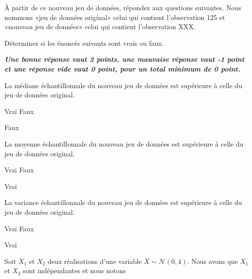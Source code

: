 \begin{questions}
\begin{parts}
À partir de ce nouveau jeu de données, répondez aux questions suivantes. Nous nommons «jeu de données original» celui qui contient l'observation 125 et «nouveau jeu de données» celui qui contient l'observation XXX.

Déterminez si les énoncés suivants sont vrais ou faux. 

\textbf{\textit{Une bonne réponse vaut 2 points, une mauvaise réponse vaut -1 point et une réponse vide vaut 0 point, pour un total minimum de 0 point.}}

\begin{subparts}
\subpart La médiane échantillonnale du nouveau jeu de données est supérieure à celle du jeu de données original.

    \begin{oneparcheckboxes}
        \choice Vrai
        \correctchoice Faux
    \end{oneparcheckboxes}
    
\begin{solution}
    Faux
\end{solution}

\subpart La moyenne échantillonnale du nouveau jeu de données est supérieure à celle du jeu de données original.

    \begin{oneparcheckboxes}
        \correctchoice Vrai
        \choice Faux
    \end{oneparcheckboxes}
    
\begin{solution}
    Vrai
\end{solution}

\subpart La variance échantillonnale du nouveau jeu de données est supérieure à celle du jeu de données original.

    \begin{oneparcheckboxes}
        \correctchoice Vrai
        \choice Faux
    \end{oneparcheckboxes}
    
\begin{solution}
    Vrai
\end{solution}

\end{subparts}
\end{parts}

\newpage

\question\label{estimateursPonctuels} 
Soit $X_1$ et $X_2$ deux réalisations d'une variable $X\sim\mathcal{N}(0, 4)$. Nous avons que $X_1$ et $X_2$ sont indépendantes et nous notons


\end{questions}
